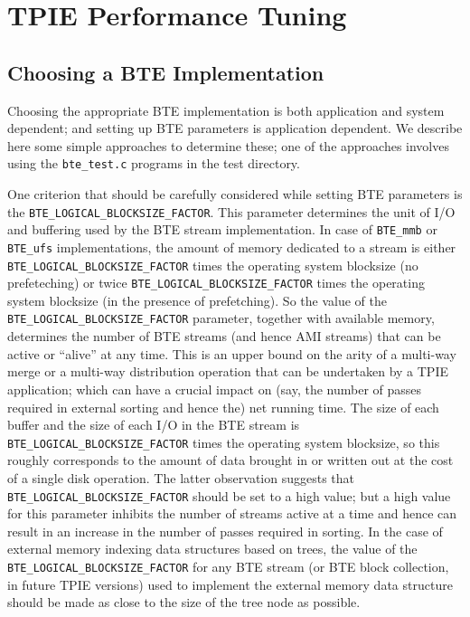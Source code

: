 \chapter{TPIE Performance Tuning}

\section{Choosing a BTE Implementation} %

Choosing the appropriate BTE implementation is both application and
system dependent; and setting up BTE parameters is 
application dependent. We describe here some simple approaches
to determine these; one of the approaches involves using the
\verb|bte_test.c| programs in the test directory.

One criterion that should be carefully considered while setting BTE 
parameters is the \verb|BTE_LOGICAL_BLOCKSIZE_FACTOR|. This parameter
determines the unit of I/O and buffering used by the BTE stream
implementation. In case of \verb|BTE_mmb| or \verb|BTE_ufs|
implementations,  the amount of memory dedicated to a stream is 
either \verb|BTE_LOGICAL_BLOCKSIZE_FACTOR| times the operating system 
blocksize (no prefeteching) or twice  
\verb|BTE_LOGICAL_BLOCKSIZE_FACTOR| times the operating system  blocksize
(in the presence of prefetching). So the value of the
\verb|BTE_LOGICAL_BLOCKSIZE_FACTOR| parameter, together with available
memory, determines the number of BTE streams (and hence AMI streams)
that can be active or ``alive'' at any time. This is an upper bound on
the arity of a multi-way merge or a multi-way distribution operation
that can be undertaken by a TPIE application; which can have a crucial
impact on (say, the number of passes required in external sorting and
hence the) net running time. The size of each buffer and the size of
each I/O in the BTE stream is \verb|BTE_LOGICAL_BLOCKSIZE_FACTOR|
times the operating system  blocksize, so this roughly
corresponds to the amount of data brought in or written out at the
cost of a single disk operation.  The latter observation suggests
that \verb|BTE_LOGICAL_BLOCKSIZE_FACTOR| should be set to a high
value; but a high value for this parameter inhibits the number of 
streams active at a time and hence can result in an increase in the
number of passes required in sorting. In the case of external memory
indexing data structures based on trees, the value of the 
\verb|BTE_LOGICAL_BLOCKSIZE_FACTOR| for any BTE stream (or BTE block
collection, in future TPIE versions) used to implement 
the external memory data structure should be made as close to the size
of the tree node as possible.

